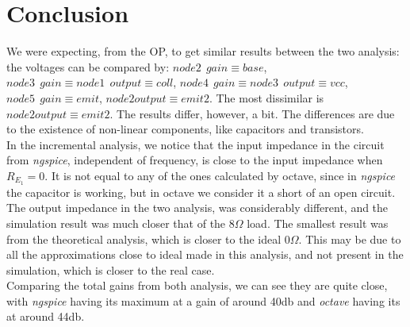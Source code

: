 \section{Conclusion}
We were expecting, from the OP, to get similar results between the two analysis: the voltages can be compared by: $node 2\ \ gain\equiv base$, $node 3\ \ gain\equiv node 1 \ \ output\equiv coll$, $node 4\ \ gain\equiv node3\ \ output \equiv vcc$,$node5 \ \ gain\equiv emit$, $node 2 output\equiv emit2$. The most dissimilar is $node 2 output\equiv emit2$.
The results differ, however, a bit. The differences are due to the existence of non-linear components, like capacitors and transistors. \\
In the incremental analysis, we notice that the input impedance in the circuit from \textit{ngspice}, independent of frequency, is close to the input impedance when $R_{E_1}=0$. It is not equal to any of the ones calculated by octave, since in \textit{ngspice} the capacitor is working, but in octave we consider it a short of an open circuit.\\
The output impedance in the two analysis, was considerably different, and the simulation result was much closer that of the $8 \Omega$ load. The smallest result was from the theoretical analysis, which is closer to the ideal $0 \Omega$. This may be due to all the approximations close to ideal made in this analysis, and not present in the simulation, which is closer to the real case.\\
Comparing the total gains from both analysis, we can see they are quite close, with \textit{ngspice} having its maximum at a gain of around 40db and \textit{octave} having its at around 44db. 
